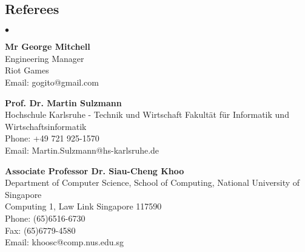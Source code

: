 \documentclass[margin,line]{res}
\newenvironment{list2}{
  \begin{list}{$\bullet$}{%
      \setlength{\itemsep}{0in}
      \setlength{\parsep}{0in} \setlength{\parskip}{0in}
      \setlength{\topsep}{0in} \setlength{\partopsep}{0in} 
      \setlength{\leftmargin}{0.2in}}}{\end{list}}
\newcommand{\ignore}[1]{}
\begin{document}
\begin{resume}
\section{\sc Referees}
\begin{list2}
\item {\bf  Mr George Mitchell} \\
Engineering Manager \\
Riot Games  \\
Email: gogito@gmail.com\\ 
\item {\bf  Prof. Dr. Martin Sulzmann} \\
Hochschule Karlsruhe - Technik und Wirtschaft 
Fakultät für Informatik und Wirtschaftsinformatik  \\
Phone:  +49 721 925-1570  \\
Email: Martin.Sulzmann@hs-karlsruhe.de\\ 
\item {\bf Associate Professor Dr. Siau-Cheng Khoo} \\
Department of Computer Science, School of Computing, National University of Singapore \\
Computing 1, Law Link Singapore 117590 \\
Phone: (65)6516-6730 \\
Fax: (65)6779-4580 \\ 
Email: khoosc@comp.nus.edu.sg\\

\ignore{ 
\item {\bf Mr. Linus Wong} \\
Charter Telecom Pte Ltd, Hong Kong, \\
House 43F, Ping Long Tsuen, Lam Tsuen Taipo \\
Phone: (852)96818219 \\
Email: ong@chartertelecom.com.hk}
\end{list2}


\end{resume}
\end{document}
